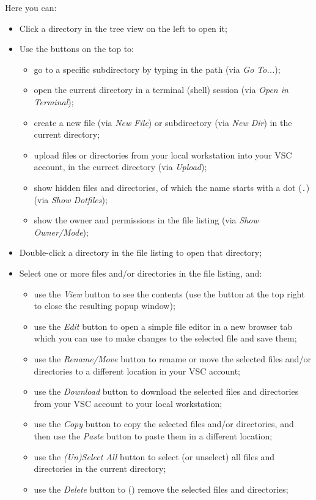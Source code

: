Here you can:

\begin{itemize}
    \item Click a directory in the tree view on the left to open it;
    \item Use the buttons on the top to:
    \begin{itemize}
        \item go to a specific subdirectory by typing in the path (via \emph{Go To...});
        \item open the current directory in a terminal (shell) session (via \emph{Open in Terminal});
        \item create a new file (via \emph{New File}) or subdirectory (via \emph{New Dir}) in the current directory;
        \item upload files or directories from your local workstation into your VSC account, in the currect directory (via \emph{Upload});
        \item show hidden files and directories, of which the name starts with a dot (\lstinline|.|) (via \emph{Show Dotfiles});
        \item show the owner and permissions in the file listing (via \emph{Show Owner/Mode});
    \end{itemize}
    \item Double-click a directory in the file listing to open that directory;
    \item Select one or more files and/or directories in the file listing, and:
    \begin{itemize}
        \item use the \emph{View} button to see the contents (use the button at the top right to close the resulting popup window);
        \item use the \emph{Edit} button to open a simple file editor in a new browser tab which you can use to make changes to the selected file and save them;
        \item use the \emph{Rename/Move} button to rename or move the selected files and/or directories to a different location in your VSC account;
        \item use the \emph{Download} button to download the selected files and directories from your VSC account to your local workstation;
        \item use the \emph{Copy} button to copy the selected files and/or directories, and then use the \emph{Paste} button to paste them in a different location;
        \item use the \emph{(Un)Select All} button to select (or unselect) all files and directories in the current directory;
        \item use the \emph{Delete} button to () remove the selected files and directories;
    \end{itemize}
\end{itemize}

